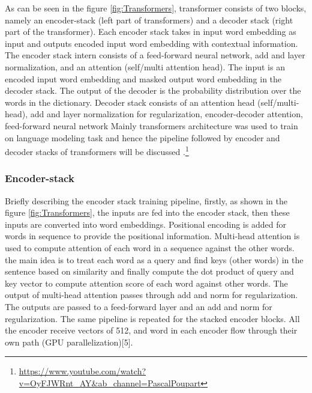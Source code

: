 As can be seen in the figure \ref{fig:Transformers}, transformer consists of two blocks, namely an encoder-stack (left part of transformers) and a decoder stack (right part of the transformer). Each encoder stack takes in input word embedding as input and outputs encoded input word embedding with contextual information. The encoder stack intern consists of a feed-forward neural network, add and layer normalization, and an attention (self/multi attention head). The input is an encoded input word embedding and masked output word embedding in the decoder stack. The output of the decoder is the probability distribution over the words in the dictionary. Decoder stack consists of  an attention head (self/multi-head), add and layer normalization for regularization, encoder-decoder attention, feed-forward neural network Mainly transformers architecture was used to train on language modeling task and hence the pipeline followed by encoder and decoder stacks of transformers will be discussed .\footnote{\url{https://www.youtube.com/watch?v=OyFJWRnt_AY&ab_channel=PascalPoupart}} \cite{vaswani2017attention}

\subsubsection{Encoder-stack}
Briefly describing the encoder stack training pipeline, firstly, as shown in the figure \ref{fig:Transformers}, the inputs are fed into the encoder stack, then these inputs are converted into word embeddings. Positional encoding is added for words in sequence to provide the positional information. Multi-head attention is used to compute attention of each word in a sequence against the other words. the main idea is to treat each word as a query and find keys (other words) in the sentence based on similarity and finally compute the dot product of query and key vector to compute attention score of each word against other words. The output of multi-head attention passes through add and norm for regularization. The outputs are passed to a feed-forward layer and an add and norm for regularization. The same pipeline is repeated for the stacked encoder blocks. All the encoder receive vectors of 512, and word in each encoder flow through their own path (GPU parallelization)[5]\cite{vaswani2017attention}.

